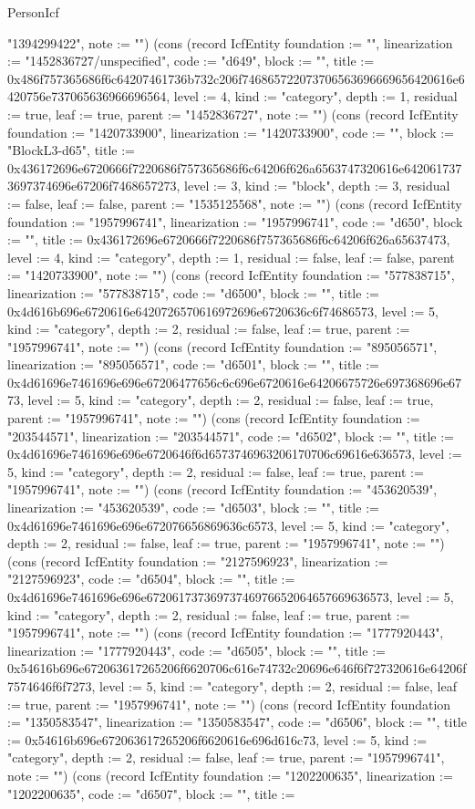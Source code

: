 \begin{lexlean}{PersonIcf}
\begin{semanticmodule}
{"1394299422", note := ""}) (cons (record IcfEntity {foundation := "", linearization := "1452836727/unspecified", code := "d649", block := "", title := 0x486f757365686f6c64207461736b732c206f746865722073706563696669656420616e6420756e737065636966696564, level := 4, kind := "category", depth := 1, residual := true, leaf := true, parent := "1452836727", note := ""}) (cons (record IcfEntity {foundation := "1420733900", linearization := "1420733900", code := "", block := "BlockL3-d65", title := 0x436172696e6720666f7220686f757365686f6c64206f626a6563747320616e6420617373697374696e67206f7468657273, level := 3, kind := "block", depth := 3, residual := false, leaf := false, parent := "1535125568", note := ""}) (cons (record IcfEntity {foundation := "1957996741", linearization := "1957996741", code := "d650", block := "", title := 0x436172696e6720666f7220686f757365686f6c64206f626a65637473, level := 4, kind := "category", depth := 1, residual := false, leaf := false, parent := "1420733900", note := ""}) (cons (record IcfEntity {foundation := "577838715", linearization := "577838715", code := "d6500", block := "", title := 0x4d616b696e6720616e6420726570616972696e6720636c6f74686573, level := 5, kind := "category", depth := 2, residual := false, leaf := true, parent := "1957996741", note := ""}) (cons (record IcfEntity {foundation := "895056571", linearization := "895056571", code := "d6501", block := "", title := 0x4d61696e7461696e696e67206477656c6c696e6720616e64206675726e697368696e6773, level := 5, kind := "category", depth := 2, residual := false, leaf := true, parent := "1957996741", note := ""}) (cons (record IcfEntity {foundation := "203544571", linearization := "203544571", code := "d6502", block := "", title := 0x4d61696e7461696e696e6720646f6d6573746963206170706c69616e636573, level := 5, kind := "category", depth := 2, residual := false, leaf := true, parent := "1957996741", note := ""}) (cons (record IcfEntity {foundation := "453620539", linearization := "453620539", code := "d6503", block := "", title := 0x4d61696e7461696e696e672076656869636c6573, level := 5, kind := "category", depth := 2, residual := false, leaf := true, parent := "1957996741", note := ""}) (cons (record IcfEntity {foundation := "2127596923", linearization := "2127596923", code := "d6504", block := "", title := 0x4d61696e7461696e696e67206173736973746976652064657669636573, level := 5, kind := "category", depth := 2, residual := false, leaf := true, parent := "1957996741", note := ""}) (cons (record IcfEntity {foundation := "1777920443", linearization := "1777920443", code := "d6505", block := "", title := 0x54616b696e672063617265206f6620706c616e74732c20696e646f6f727320616e64206f7574646f6f7273, level := 5, kind := "category", depth := 2, residual := false, leaf := true, parent := "1957996741", note := ""}) (cons (record IcfEntity {foundation := "1350583547", linearization := "1350583547", code := "d6506", block := "", title := 0x54616b696e672063617265206f6620616e696d616c73, level := 5, kind := "category", depth := 2, residual := false, leaf := true, parent := "1957996741", note := ""}) (cons (record IcfEntity {foundation := "1202200635", linearization := "1202200635", code := "d6507", block := "", title := }
\end{semanticmodule}
\end{lexlean}
